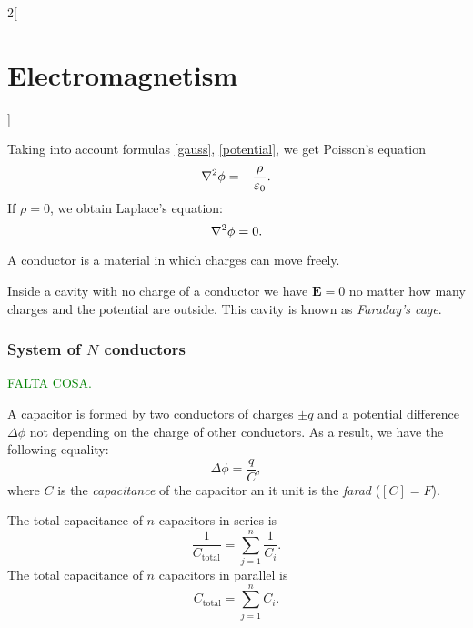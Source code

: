 \documentclass[../../../main.tex]{subfiles}
\begin{document}
\begin{multicols}{2}[\section{Electromagnetism}]
\begin{concept}
    \end{concept}
    \begin{concept}
        Taking into account formulas \ref{gauss}, \ref{potential}, we get Poisson's equation $$\nabla^2\phi=-\frac{\rho}{\varepsilon_0}.$$ If $\rho=0$, we obtain Laplace's equation: $$\nabla^2\phi=0.$$
    \end{concept}
    \begin{definition}
        A conductor is a material in which charges can move freely.
    \end{definition}
    \begin{concept}
        Inside a cavity with no charge of a conductor we have $\boldsymbol{E}=0$ no matter how many charges and the potential are outside. This cavity is known as \textit{Faraday's cage}.
    \end{concept}
    \subsubsection*{System of $N$ conductors}
    \textcolor{green}{FALTA COSA.}
    \begin{definition}[Capacitor]
        A capacitor is formed by two conductors of charges $\pm q$ and a potential difference $\Delta\phi$ not depending on the charge of other conductors. As a result, we have the following equality: $$\Delta\phi=\frac{q}{C},$$ where $C$ is the \textit{capacitance} of the capacitor an it unit is the \textit{farad} ($[C]=F$).
    \end{definition}
    \begin{concept}
        The total capacitance of $n$ capacitors in series is $$\frac{1}{C_\text{total}}=\sum_{j=1}^n\frac{1}{C_i}.$$
        The total capacitance of $n$ capacitors in parallel is $$C_\text{total}=\sum_{j=1}^nC_i.$$
    \end{concept}

\end{multicols}
\end{document}
